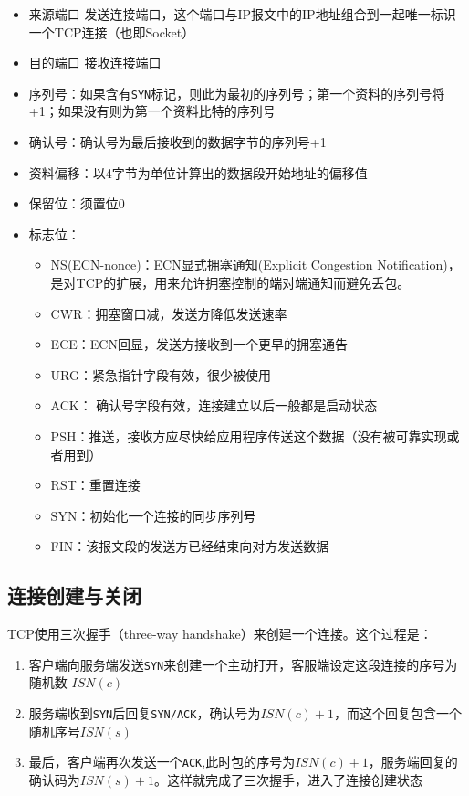 \documentclass[12pt]{article}
\begin{document}
\begin{itemize}
\tightlist
\item
  来源端口 发送连接端口，这个端口与IP报文中的IP地址组合到一起唯一标识一个TCP连接（也即Socket）
\item
  目的端口 接收连接端口
\item
  序列号：如果含有\texttt{SYN}标记，则此为最初的序列号；第一个资料的序列号将+1；如果没有则为第一个资料比特的序列号
\item
  确认号：确认号为最后接收到的数据字节的序列号+1
\item
  资料偏移：以4字节为单位计算出的数据段开始地址的偏移值
\item
  保留位：须置位0
\item
  标志位：

  \begin{itemize}
  \tightlist
  \item
    NS(ECN-nonce)：ECN显式拥塞通知(Explicit Congestion Notification)，是对TCP的扩展，用来允许拥塞控制的端对端通知而避免丢包。
  \item
    CWR：拥塞窗口减，发送方降低发送速率
  \item
    ECE：ECN回显，发送方接收到一个更早的拥塞通告
  \item
    URG：紧急指针字段有效，很少被使用
  \item
    ACK： 确认号字段有效，连接建立以后一般都是启动状态
  \item
    PSH：推送，接收方应尽快给应用程序传送这个数据（没有被可靠实现或者用到）
  \item
    RST：重置连接
  \item
    SYN：初始化一个连接的同步序列号
  \item
    FIN：该报文段的发送方已经结束向对方发送数据
  \end{itemize}
\end{itemize}

\subsection{连接创建与关闭}\label{ux8fdeux63a5ux521bux5efaux4e0eux5173ux95ed}

TCP使用三次握手（three-way handshake）来创建一个连接。这个过程是：

\begin{enumerate}
\def\labelenumi{\arabic{enumi}.}
\tightlist
\item
  客户端向服务端发送\texttt{SYN}来创建一个主动打开，客服端设定这段连接的序号为随机数 \(ISN(c)\)
\item
  服务端收到\texttt{SYN}后回复\texttt{SYN/ACK}，确认号为\(ISN(c)+1\)，而这个回复包含一个随机序号\(ISN(s)\)
\item
  最后，客户端再次发送一个\texttt{ACK},此时包的序号为\(ISN(c) + 1\)，服务端回复的确认码为\(ISN(s) + 1\)。这样就完成了三次握手，进入了连接创建状态
\end{enumerate}
\end{document}
